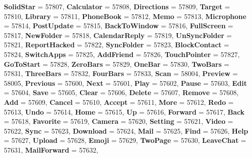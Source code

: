 \begin{DoxyCompactItemize}
{\bfseries Solid\+Star} = 57807, 
{\bfseries Calculator} = 57808, 
{\bfseries Directions} = 57809, 
\newline
{\bfseries Target} = 57810, 
{\bfseries Library} = 57811, 
{\bfseries Phone\+Book} = 57812, 
{\bfseries Memo} = 57813, 
\newline
{\bfseries Microphone} = 57814, 
{\bfseries Post\+Update} = 57815, 
{\bfseries Back\+To\+Window} = 57816, 
{\bfseries Full\+Screen} = 57817, 
\newline
{\bfseries New\+Folder} = 57818, 
{\bfseries Calendar\+Reply} = 57819, 
{\bfseries Un\+Sync\+Folder} = 57821, 
{\bfseries Report\+Hacked} = 57822, 
\newline
{\bfseries Sync\+Folder} = 57823, 
{\bfseries Block\+Contact} = 57824, 
{\bfseries Switch\+Apps} = 57825, 
{\bfseries Add\+Friend} = 57826, 
\newline
{\bfseries Touch\+Pointer} = 57827, 
{\bfseries Go\+To\+Start} = 57828, 
{\bfseries Zero\+Bars} = 57829, 
{\bfseries One\+Bar} = 57830, 
\newline
{\bfseries Two\+Bars} = 57831, 
{\bfseries Three\+Bars} = 57832, 
{\bfseries Four\+Bars} = 57833, 
{\bfseries Scan} = 58004, 
\newline
{\bfseries Preview} = 58005, 
{\bfseries Previous} = 57600, 
{\bfseries Next} = 57601, 
{\bfseries Play} = 57602, 
\newline
{\bfseries Pause} = 57603, 
{\bfseries Edit} = 57604, 
{\bfseries Save} = 57605, 
{\bfseries Clear} = 57606, 
\newline
{\bfseries Delete} = 57607, 
{\bfseries Remove} = 57608, 
{\bfseries Add} = 57609, 
{\bfseries Cancel} = 57610, 
\newline
{\bfseries Accept} = 57611, 
{\bfseries More} = 57612, 
{\bfseries Redo} = 57613, 
{\bfseries Undo} = 57614, 
\newline
{\bfseries Home} = 57615, 
{\bfseries Up} = 57616, 
{\bfseries Forward} = 57617, 
{\bfseries Back} = 57618, 
\newline
{\bfseries Favorite} = 57619, 
{\bfseries Camera} = 57620, 
{\bfseries Setting} = 57621, 
{\bfseries Video} = 57622, 
\newline
{\bfseries Sync} = 57623, 
{\bfseries Download} = 57624, 
{\bfseries Mail} = 57625, 
{\bfseries Find} = 57626, 
\newline
{\bfseries Help} = 57627, 
{\bfseries Upload} = 57628, 
{\bfseries Emoji} = 57629, 
{\bfseries Two\+Page} = 57630, 
\newline
{\bfseries Leave\+Chat} = 57631, 
{\bfseries Mail\+Forward} = 57632, 

\end{DoxyCompactItemize}
